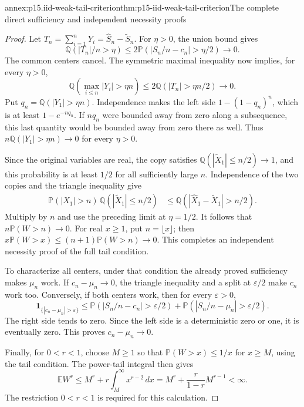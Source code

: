 \begin{annexitem}{annex:p15.iid-weak-tail-criterion}{thm:p15-iid-weak-tail-criterion}{The complete direct sufficiency and independent necessity proofs}
\begin{proof}
Let \(T_n=\sum_{i=1}^nY_i=\widehat S_n-\widetilde S_n\).
For \(\eta>0\), the union bound gives
\[
 \mathbb Q(|T_n|/n>\eta)
 \leq2\mathbb P(|S_n/n-c_n|>\eta/2)\longrightarrow0.
\]
The common centers cancel. The symmetric maximal inequality now
implies, for every \(\eta>0\),
\[
 \mathbb Q\!\left(\max_{i\leq n}|Y_i|>\eta n\right)
       \leq2\mathbb Q(|T_n|>\eta n/2)\longrightarrow0.
\]
Put \(q_n=\mathbb Q(|Y_1|>\eta n)\). Independence makes the
left side \(1-(1-q_n)^n\), which is at least \(1-e^{-nq_n}\).
If \(nq_n\) were bounded away from zero along a subsequence,
this last quantity would be bounded away from zero there as well.
Thus \(n\mathbb Q(|Y_1|>\eta n)\to0\) for every \(\eta>0\).

Since the original variables are real, the copy satisfies
\(\mathbb Q(|\widetilde X_1|\leq n/2)\to1\), and this probability
is at least \(1/2\) for all sufficiently large \(n\).
Independence of the two copies and the triangle inequality give
\[
 \begin{aligned}
 \mathbb P(|X_1|>n)\,
      \mathbb Q(|\widetilde X_1|\leq n/2)
 &\leq\mathbb Q(|\widehat X_1-\widetilde X_1|>n/2).
 \end{aligned}
\]
Multiply by \(n\) and use the preceding limit at \(\eta=1/2\).
It follows that \(n\mathbb P(W>n)\to0\).
For real \(x\geq1\), put \(n=\lfloor x\rfloor\); then
\(x\mathbb P(W>x)\leq(n+1)\mathbb P(W>n)\to0\).
This completes an independent necessity proof of the full tail condition.

To characterize all centers, under that condition the already proved
sufficiency makes \(\mu_n\) work. If \(c_n-\mu_n\to0\), the
triangle inequality and a split at \(\varepsilon/2\) make \(c_n\)
work too. Conversely, if both centers work, then for every
\(\varepsilon>0\),
\[
 \mathbf1_{\{|c_n-\mu_n|>\varepsilon\}}
 \leq\mathbb P(|S_n/n-c_n|>\varepsilon/2)
       +\mathbb P(|S_n/n-\mu_n|>\varepsilon/2).
\]
The right side tends to zero. Since the left side is a deterministic
zero or one, it is eventually zero. This proves \(c_n-\mu_n\to0\).

Finally, for \(0<r<1\), choose \(M\geq1\) so that
\(\mathbb P(W>x)\leq1/x\) for \(x\geq M\), using the tail condition.
The power-tail integral then gives
\[
 \mathbb EW^r
 \leq M^r+r\int_M^\infty x^{r-2}\,dx
 =M^r+\frac{r}{1-r}M^{r-1}<\infty.
\]
The restriction \(0<r<1\) is required for this calculation.
\end{proof}
\end{annexitem}

